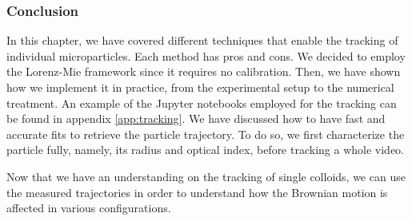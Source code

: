 \subsubsection{Conclusion}

In this chapter, we have covered different techniques that enable the tracking of individual microparticles. Each method has pros and cons. We decided to employ the Lorenz-Mie framework since it requires no calibration. Then, we have shown how we implement it in practice, from the experimental setup to the numerical treatment. An example of the Jupyter notebooks employed for the tracking can be found in appendix \ref{app:tracking}.  We have discussed how to have fast and accurate fits to retrieve the particle trajectory. To do so, we first characterize the particle fully, namely, its radius and optical index, before tracking a whole video. 

Now that we have an understanding on the tracking of single colloids, we can use the measured trajectories in order to understand how the Brownian motion is affected in various configurations. 

